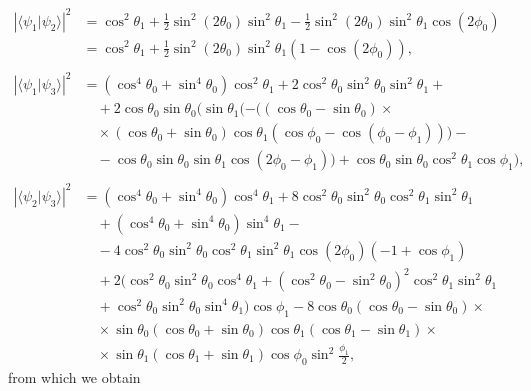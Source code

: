 \documentclass[letterpaper,onecolumn,12pt,accepted=2024-01-17]{article}
\begin{document}
\begin{align*}
    |\langle \psi_1\vert \psi_2 \rangle|^2 & =  \cos^2\theta_1 + \frac{1}{2} \sin^2(2\theta_0) \sin^2\theta_1 - \frac{1}{2} \sin^2(2\theta_0) \sin^2\theta_1 \cos(2\phi_0)\\
    &=\cos^2\theta_1+\frac{1}{2} \sin^2(2\theta_0) \sin^2\theta_1(1-\cos(2\phi_0)),\\ \\
    |\langle\psi_1\vert\psi_3\rangle|^2 &= (\cos^4\theta_0 + \sin^4\theta_0)\cos^2\theta_1 + 2 \cos^2\theta_0 \sin^2\theta_0 \sin^2\theta_1 +\\
    &\quad +2\cos\theta_0 \sin\theta_0 (\sin\theta_1 (-((\cos\theta_0 - \sin\theta_0) \times \\
    &\quad\times (\cos\theta_0 + \sin\theta_0)\cos\theta_1 (\cos\phi_0 - \cos(\phi_0 - \phi_1))) -\\
    &\quad -\cos\theta_0 \sin\theta_0 \sin\theta_1 \cos(2\phi_0 - \phi_1)) + \cos\theta_0 \sin\theta_0 \cos^2\theta_1 \cos\phi_1), \\ \\
     |\langle\psi_2 \vert \psi_3 \rangle |^2 &= (\cos^4\theta_0 + \sin^4\theta_0) \cos^4\theta_1 + 8 \cos^2\theta_0 \sin^2\theta_0 \cos^2\theta_1 \sin^2\theta_1 \\
     &\quad + (\cos^4\theta_0 + \sin^4\theta_0) \sin^4\theta_1 -\\
     &\quad -4 \cos^2\theta_0 \sin^2\theta_0 \cos^2\theta_1 \sin^2\theta_1 \cos(2\phi_0) (-1 + \cos\phi_1)\\
     &\quad + 2 (\cos^2\theta_0 \sin^2\theta_0 \cos^4\theta_1 + (\cos^2\theta_0 - \sin^2\theta_0)^2 \cos^2\theta_1 \sin^2\theta_1 \\
     &\quad + \cos^2\theta_0 \sin^2\theta_0 \sin^4\theta_1) \cos\phi_1 - 8 \cos\theta_0 (\cos\theta_0 - \sin\theta_0)\times\\
     &\quad \times\sin\theta_0 (\cos\theta_0 + \sin\theta_0) \cos\theta_1 (\cos\theta_1 - \sin\theta_1)\times\\
     &\quad \times \sin\theta_1 (\cos\theta_1 + \sin\theta_1) \cos\phi_0 \sin^2\frac{\phi_1}{2},
\end{align*}
from which we obtain
\end{document}
